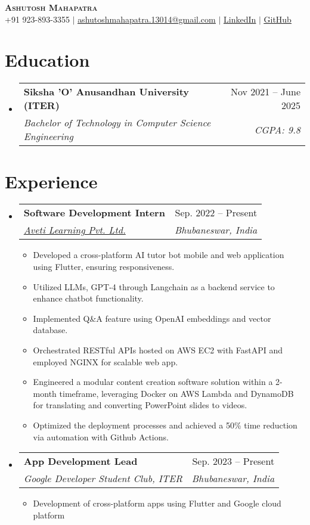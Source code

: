 \documentclass[letterpaper,11pt]{article}
\makeatletter
\newcommand{\resumeItem}[1]{
  \item\small{
    {#1 \vspace{-2pt}}
  }
}
\newcommand{\resumeSubheading}[4]{
  \vspace{2pt}\item
    \begin{tabular*}{0.97\textwidth}[t]{l@{\extracolsep{\fill}}r}
      \textbf{#1} & #2 \\
      \textit{\small#3} & \textit{\small #4} \\
    \end{tabular*}\vspace{-5pt}
}
\newcommand{\resumeSubHeadingListStart}{\begin{itemize}[leftmargin=0.15in, label={}]}
\newcommand{\resumeSubHeadingListEnd}{\vspace{-10pt}\end{itemize}}
\newcommand{\resumeItemListStart}{\begin{itemize}}
\newcommand{\resumeItemListEnd}{\end{itemize}\vspace{0pt}}
\makeatother
\begin{document}
\begin{center}
  \textbf{\Huge \scshape Ashutosh Mahapatra} \\ \vspace{5pt}
  \small +91 923-893-3355 $|$ \href{mailto:ashutoshmahapatra.13014@gmail.com}{\underline{ashutoshmahapatra.13014@gmail.com}} $|$
  \href{https://linkedin.com/in/ashutosh-mahapatra29/}{\underline{LinkedIn}} $|$
  \href{https://github.com/AM-ash-OR-AM-I}{\underline{GitHub}}
\end{center}


\section{Education}
\resumeSubHeadingListStart
\resumeSubheading
{Siksha 'O' Anusandhan University (ITER)}{Nov 2021 -- June 2025}
{Bachelor of Technology in Computer Science Engineering}{ CGPA: 9.8 }
\resumeSubHeadingListEnd


\section{Experience}
\resumeSubHeadingListStart
\resumeSubheading
{Software Development Intern}{Sep. 2022 -- Present}
{\href{https://avetilearning.com/}{Aveti Learning Pvt. Ltd.}}{Bhubaneswar, India}
\resumeItemListStart
\resumeItem{ Developed a cross-platform AI tutor bot mobile and web application using Flutter, ensuring responsiveness.}
\resumeItem{ Utilized LLMs, GPT-4 through Langchain as a backend service to enhance chatbot functionality.}
\resumeItem{ Implemented Q\&A feature using OpenAI embeddings and vector database.}
\resumeItem{ Orchestrated RESTful APIs hosted on AWS EC2 with FastAPI and employed NGINX for scalable web app.}
\resumeItem{Engineered a modular content creation software solution within a 2-month timeframe, leveraging Docker on AWS Lambda and DynamoDB for translating and converting PowerPoint slides to videos.}
\resumeItem{Optimized the deployment processes and achieved a 50\% time reduction via automation with Github Actions.}
\resumeItemListEnd
\resumeSubHeadingListEnd
\resumeSubHeadingListStart
\resumeSubheading
{App Development Lead}{Sep. 2023 -- Present}
{Google Developer Student Club, ITER} {Bhubaneswar, India}
\resumeItemListStart
\resumeItem { Development of cross-platform apps using Flutter and Google cloud platform}
\resumeItemListEnd
\resumeSubHeadingListEnd
\end{document}
